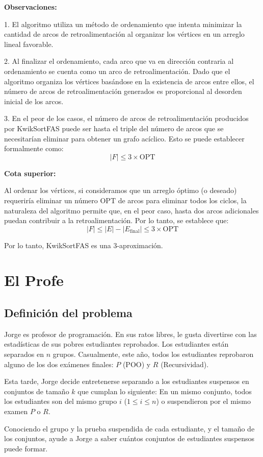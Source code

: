 \documentclass{article}
\begin{document}
\textbf{Observaciones:}

1. El algoritmo utiliza un método de ordenamiento que intenta minimizar la cantidad de arcos de retroalimentación al organizar los vértices en un arreglo lineal favorable.
  
2. Al finalizar el ordenamiento, cada arco que va en dirección contraria al ordenamiento se cuenta como un arco de retroalimentación. Dado que el algoritmo organiza los vértices basándose en la existencia de arcos entre ellos, el número de arcos de retroalimentación generados es proporcional al desorden inicial de los arcos.

3. En el peor de los casos, el número de arcos de retroalimentación producidos por KwikSortFAS puede ser hasta el triple del número de arcos que se necesitarían eliminar para obtener un grafo acíclico. Esto se puede establecer formalmente como:
   \[
   |F| \leq 3 \times \text{OPT}
   \]

\textbf{Cota superior:}

Al ordenar los vértices, si consideramos que un arreglo óptimo (o deseado) requeriría eliminar un número \(\text{OPT}\) de arcos para eliminar todos los ciclos, la naturaleza del algoritmo permite que, en el peor caso, hasta dos arcos adicionales puedan contribuir a la retroalimentación. Por lo tanto, se establece que:
\[
|F| \leq |E| - |E_{\text{final}}| \leq 3 \times \text{OPT}
\]

Por lo tanto, KwikSortFAS es una 3-aproximación.



	\section{El Profe}

	\subsection{Definición del problema}
	Jorge es profesor de programación. En sus ratos libres, le gusta divertirse con las estadísticas de sus pobres estudiantes reprobados. Los estudiantes están separados en $n$ grupos. Casualmente, este año, todos los estudiantes reprobaron alguno de los dos exámenes finales: $P$ (POO) y $R$ (Recursividad).

Esta tarde, Jorge decide entretenerse separando a los estudiantes suspensos en conjuntos de tamaño $k$ que cumplan lo siguiente: En un mismo conjunto, todos los estudiantes son del mismo grupo $i$ ($1 \leq i \leq n$) o suspendieron por el mismo examen $P$ o $R$.

Conociendo el grupo y la prueba suspendida de cada estudiante, y el tamaño de los conjuntos, ayude a Jorge a saber cuántos conjuntos de estudiantes suspensos puede formar.
\end{document}
